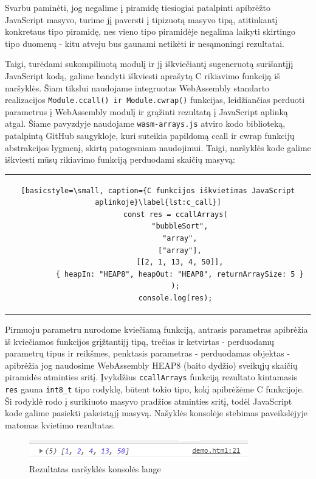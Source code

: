 \documentclass{VUMIFPSkursinis}
\begin{document}
Svarbu paminėti, jog negalime į piramidę tiesiogiai patalpinti apibrėžto JavaScript masyvo, turime jį paversti į tipizuotą masyvo tipą, atitinkantį konkretaus tipo piramidę, nes vieno tipo piramidėje negalima laikyti skirtingo tipo duomenų - kitu atveju bus gaunami netikėti ir nesąmoningi rezultatai. 

Taigi, turėdami sukompiliuotą modulį ir jį iškviečiantį sugeneruotą surišantįjį JavaScript kodą, galime bandyti iškviesti aprašytą C rikiavimo funkciją iš naršyklės. Šiam tikslui naudojame integruotas WebAssembly standarto realizacijos \lstinline[columns=fixed]{Module.ccall() ir Module.cwrap()} funkcijas, leidžiančias perduoti parametrus į WebAssembly modulį ir grąžinti rezultatą į JavaScript aplinką atgal. Šiame pavyzdyje naudojame \lstinline[columns=fixed]{wasm-arrays.js} atviro kodo biblioteką, patalpintą GitHub saugykloje, kuri suteikia papildomą ccall ir cwrap funkcijų abstrakcijos lygmenį, skirtą patogesniam naudojimui. Taigi, naršyklės kode galime iškviesti mūsų rikiavimo funkciją perduodami skaičių masyvą:
\begin{center}
\begin{tabular}{c}
\begin{lstlisting}[basicstyle=\small, caption={C funkcijos iškvietimas JavaScript aplinkoje}\label{lst:c_call}]
        const res = ccallArrays(
          "bubbleSort",
          "array",
          ["array"],
          [[2, 1, 13, 4, 50]],
          { heapIn: "HEAP8", heapOut: "HEAP8", returnArraySize: 5 }
        );
        console.log(res);
\end{lstlisting}
\end{tabular}
\end{center}
Pirmuoju parametru nurodome kviečiamą funkciją, antrasis parametras apibrėžia iš kviečiamos funkcijos grįžtantijį tipą, trečias ir ketvirtas - perduodamų parametrų tipus ir reikšmes, penktasis parametras - perduodamas objektas - apibrėžia jog naudosime WebAssembly HEAP8 (baito dydžio) sveikųjų skaičių piramidės atminties sritį. Įvykdžius \lstinline[columns=fixed]{ccallArrays} funkciją rezultato kintamasis \lstinline[columns=fixed]{res} gauna \lstinline[columns=fixed]{int8_t} tipo rodyklę, būtent tokio tipo, kokį apibrėžėme C funkcijoje. Ši rodyklė rodo į surikiuoto masyvo pradžios atminties sritį, todėl JavaScript kode galime pasiekti pakeistąjį masyvą. Našyklės konsolėje stebimas paveikslėjyje matomas kvietimo rezultatas.

\begin{figure}[h!]
  \begin{center}
  \includegraphics[scale=0.7]{sorted_array.png}
  \end{center}
  \caption{Rezultatas naršyklės konsolės lange}
  \label{fig:sorted_array}
\end{figure}
\end{document}
